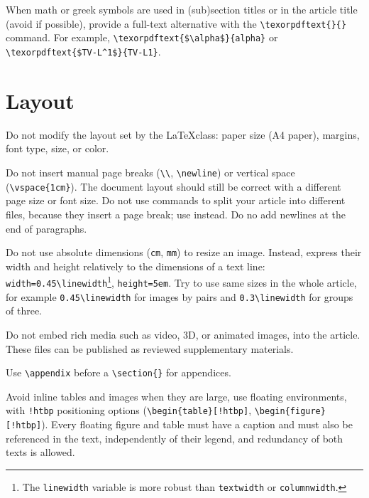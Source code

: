 \documentclass{ipol}
\begin{document}
When math or greek symbols are used in (sub)section titles or in the
article title (avoid if possible), provide a full-text alternative
with the \verb|\texorpdftext{}{}| command. For example,
\verb|\texorpdftext{$\alpha$}{alpha}| or
\verb|\texorpdftext{$TV-L^1$}{TV-L1}|.

\section{Layout}

Do not modify the layout set by the \LaTeX class: paper size (A4
paper), margins, font type, size, or color.

Do not insert manual page breaks (\verb|\\|, \verb|\newline|) or
vertical space (\verb|\vspace{1cm}|). The document layout should still
be correct with a different page size or font size. Do not use
\verb|| commands to split your article into different files,
because they insert a page break; use \verb|| instead.
Do no add newlines at the end of paragraphs.

Do not use absolute dimensions (\verb|cm|, \verb|mm|) to resize an
image. Instead, express their width and height relatively to the
dimensions of a text line: \verb|width=0.45\linewidth|\footnote{The
  \verb|linewidth| variable is more robust than \verb|textwidth| or
  \verb|columnwidth|.}, \verb|height=5em|. Try to use same sizes in
the whole article, for example \verb|0.45\linewidth| for images by
pairs and \verb|0.3\linewidth| for groups of three.

Do not embed rich media such as video, 3D, or animated images, into
the article. These files can be published as reviewed supplementary
materials.

Use \verb|\appendix| before a \verb|\section{}| for appendices.

Avoid inline tables and images when they are large, use floating
environments, with \verb|!htbp| positioning options
(\verb|\begin{table}[!htbp]|, \verb|\begin{figure}[!htbp]|). Every
floating figure and table must have a caption and must also be
referenced in the text, independently of their legend, and redundancy
of both texts is allowed.
\end{document}
